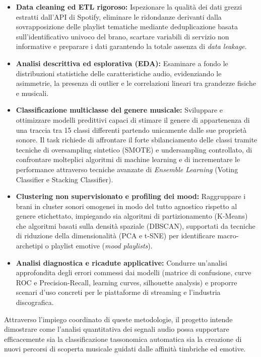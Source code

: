 \begin{itemize}
    \item \textbf{Data cleaning ed ETL rigoroso:} Ispezionare la qualità dei dati grezzi estratti dall'API di Spotify, eliminare le ridondanze derivanti dalla sovrapposizione delle playlist tematiche mediante deduplicazione basata sull'identificativo univoco del brano, scartare variabili di servizio non informative e preparare i dati garantendo la totale assenza di \textit{data leakage}.
    \item \textbf{Analisi descrittiva ed esplorativa (EDA):} Esaminare a fondo le distribuzioni statistiche delle caratteristiche audio, evidenziando le asimmetrie, la presenza di outlier e le correlazioni lineari tra grandezze fisiche e musicali.
    \item \textbf{Classificazione multiclasse del genere musicale:} Sviluppare e ottimizzare modelli predittivi capaci di stimare il genere di appartenenza di una traccia tra 15 classi differenti partendo unicamente dalle sue proprietà sonore. Il task richiede di affrontare il forte sbilanciamento delle classi tramite tecniche di oversampling sintetico (SMOTE) e undersampling controllato, di confrontare molteplici algoritmi di machine learning e di incrementare le performance attraverso tecniche avanzate di \textit{Ensemble Learning} (Voting Classifier e Stacking Classifier).
    \item \textbf{Clustering non supervisionato e profiling dei mood:} Raggruppare i brani in cluster sonori omogenei in modo del tutto agnostico rispetto al genere etichettato, impiegando sia algoritmi di partizionamento (K-Means) che algoritmi basati sulla densità spaziale (DBSCAN), supportati da tecniche di riduzione della dimensionalità (PCA e t-SNE) per identificare macro-archetipi o playlist emotive (\textit{mood playlists}).
    \item \textbf{Analisi diagnostica e ricadute applicative:} Condurre un'analisi approfondita degli errori commessi dai modelli (matrice di confusione, curve ROC e Precision-Recall, learning curves, silhouette analysis) e proporre scenari d'uso concreti per le piattaforme di streaming e l'industria discografica.
\end{itemize}

Attraverso l'impiego coordinato di queste metodologie, il progetto intende dimostrare come l'analisi quantitativa dei segnali audio possa supportare efficacemente sia la classificazione tassonomica automatica sia la creazione di nuovi percorsi di scoperta musicale guidati dalle affinità timbriche ed emotive.

